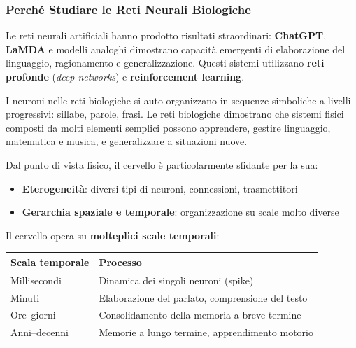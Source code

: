 \subsubsection{Perché Studiare le Reti Neurali Biologiche}

Le reti neurali artificiali hanno prodotto risultati straordinari: \textbf{ChatGPT}, \textbf{LaMDA} e modelli analoghi dimostrano capacità emergenti di elaborazione del linguaggio, ragionamento e generalizzazione. Questi sistemi utilizzano \textbf{reti profonde} (\textit{deep networks}) e \textbf{reinforcement learning}.

\begin{tcolorbox}[colback=gray!5, colframe=gray!40, arc=2mm, boxrule=0.5pt]
I neuroni nelle reti biologiche si auto-organizzano in sequenze simboliche a livelli progressivi: sillabe, parole, frasi. Le reti biologiche dimostrano che sistemi fisici composti da molti elementi semplici possono apprendere, gestire linguaggio, matematica e musica, e generalizzare a situazioni nuove.
\end{tcolorbox}



Dal punto di vista fisico, il cervello è particolarmente sfidante per la sua:

\begin{itemize}
    \item \textbf{Eterogeneità}: diversi tipi di neuroni, connessioni, trasmettitori
    \item \textbf{Gerarchia spaziale e temporale}: organizzazione su scale molto diverse
\end{itemize}

Il cervello opera su \textbf{molteplici scale temporali}:

\begin{table}[htbp]
    \centering
    \renewcommand{\arraystretch}{1.3}
    \begin{tabularx}{\textwidth}{|l|X|}
    \hline
    \textbf{Scala temporale} & \textbf{Processo} \\
    \hline
    Millisecondi & Dinamica dei singoli neuroni (spike) \\
    Minuti & Elaborazione del parlato, comprensione del testo \\
    Ore–giorni & Consolidamento della memoria a breve termine \\
    Anni–decenni & Memorie a lungo termine, apprendimento motorio \\
    \hline
    \end{tabularx}
\end{table}


